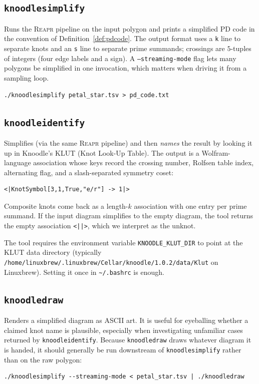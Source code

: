 \documentclass[11pt,oneside]{report}
\theoremstyle{definition}
\begin{document}
\subsection{\texttt{knoodlesimplify}}

Runs the \textsc{Reapr} pipeline on the input polygon and prints a
simplified PD code in the convention of Definition~\ref{def:pdcode}. The
output format uses a \texttt{k} line to separate knots and an \texttt{s}
line to separate prime summands; crossings are $5$-tuples of integers
(four edge labels and a sign). A \texttt{--streaming-mode} flag lets many
polygons be simplified in one invocation, which matters when driving it
from a sampling loop.

\begin{lstlisting}[style=shell,caption={Simplify a polygon to a PD code},captionpos=b]
./knoodlesimplify petal_star.tsv > pd_code.txt
\end{lstlisting}

\subsection{\texttt{knoodleidentify}}

Simplifies (via the same \textsc{Reapr} pipeline) and then \emph{names} the
result by looking it up in Knoodle's KLUT (Knot Look-Up Table). The output
is a Wolfram-language association whose keys record the crossing number,
Rolfsen table index, alternating flag, and a slash-separated symmetry
coset:
\begin{lstlisting}[style=shell]
<|KnotSymbol[3,1,True,"e/r"] -> 1|>
\end{lstlisting}
Composite knots come back as a length-$k$ association with one entry per
prime summand. If the input diagram simplifies to the empty diagram, the
tool returns the empty association \texttt{<||>}, which we interpret as
the unknot.

The tool requires the environment variable \texttt{KNOODLE\_KLUT\_DIR}
to point at the KLUT data directory (typically
\texttt{/home/linuxbrew/.linuxbrew/Cellar/knoodle/1.0.2/data/Klut} on
Linuxbrew). Setting it once in \texttt{\textasciitilde/.bashrc} is enough.

\subsection{\texttt{knoodledraw}}

Renders a simplified diagram as ASCII art. It is useful for eyeballing
whether a claimed knot name is plausible, especially when investigating
unfamiliar cases returned by \texttt{knoodleidentify}. Because
\texttt{knoodledraw} draws whatever diagram it is handed, it should
generally be run downstream of \texttt{knoodlesimplify} rather than on the
raw polygon:
\begin{lstlisting}[style=shell]
./knoodlesimplify --streaming-mode < petal_star.tsv | ./knoodledraw
\end{lstlisting}
\end{document}
